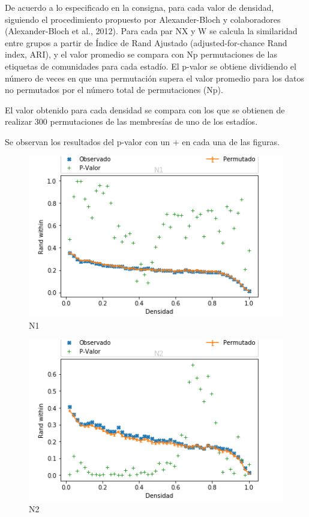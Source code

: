 
De acuerdo a lo especificado en la consigna, para cada valor de densidad, siguiendo  el procedimiento propuesto por Alexander-Bloch y colaboradores (Alexander-Bloch et al., 2012). Para cada par NX y W se calcula la similaridad entre grupos a partir de Índice de Rand Ajustado (adjusted-for-chance Rand index, ARI), y el valor promedio se compara con Np permutaciones de las etiquetas de comunidades para cada estadío. El p-valor se obtiene dividiendo el número de veces en que una permutación supera el valor promedio para los datos no permutados por el número total de permutaciones (Np).

El valor obtenido para cada densidad se compara con los que se obtienen de realizar 300 permutaciones de las membresías de uno de los estadíos. 

Se observan los resultados del p-valor con un $+$ en cada una de las figuras.


\begin{figure}[H]
    \centering
    \includegraphics[width = 5in]{img/4_N1.png}
    \caption{N1}
    \label{fig:4_N1.png}
\end{figure}

\begin{figure}[H]
    \centering
    \includegraphics[width = 5in]{img/4_N2.png}
    \caption{N2}
    \label{fig:4_N2.png}
\end{figure}

